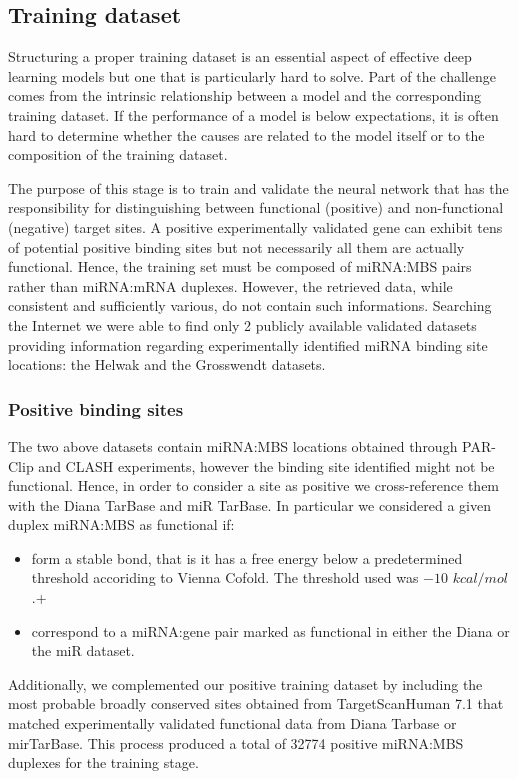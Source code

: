 \subsection{Training dataset}
Structuring a proper training dataset is an essential aspect of effective deep learning models but one that is particularly hard to solve. Part of the challenge comes from the intrinsic relationship between a model and the corresponding training dataset. If the performance of a model is below expectations, it is often hard to determine whether the causes are related to the model itself or to the composition of the training dataset.

The purpose of this stage is to train and validate the neural network that has the responsibility for distinguishing between functional (positive) and non-functional (negative) target sites. A positive experimentally validated gene can exhibit tens of potential positive binding sites  but not necessarily  all them are actually functional. Hence, the training set must be composed of miRNA:MBS pairs rather than miRNA:mRNA duplexes. However, the retrieved data, while consistent and sufficiently various, do not contain such informations. Searching the Internet we were able to find only 2 publicly available validated datasets providing information regarding experimentally identified miRNA binding site locations: the Helwak \cite{helwak} and the Grosswendt \cite{grosswendt} datasets.

\subsubsection{Positive binding sites}
The two above datasets contain miRNA:MBS locations obtained through PAR-Clip \cite{parclip}  and CLASH \cite{clash}  experiments, however the binding site identified might not be functional. Hence, in order to consider a site as positive we cross-reference them with the Diana TarBase and miR TarBase. In particular we considered a given duplex miRNA:MBS as functional if:
\begin{itemize}
	\item form a stable bond, that is it has a free energy below a predetermined threshold accoriding to Vienna Cofold. The threshold used was $-10$ $kcal/mol$.+
	\item correspond to a miRNA:gene pair marked as functional in either the Diana or the miR dataset.
\end{itemize} 
Additionally, we complemented our positive training dataset by including the most probable broadly conserved sites obtained from TargetScanHuman 7.1 \cite{targetscan} that matched experimentally validated functional data from Diana Tarbase or mirTarBase.
This process produced a total of 32774 positive miRNA:MBS duplexes for the training stage.

